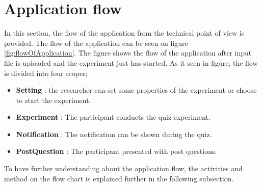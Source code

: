 %

\section{Application flow}
In this section, the flow of the application from the technical point of view is provided.
The flow of the application can be seen
on figure \ref{fig:flowOfApplication}. The figure shows the flow of the application after input file is uploaded and
the experiment just has started.
As it seen in figure, the flow is divided into four scopes;
\begin{itemize}
\item \textbf{Setting}  : the researcher can set some properties of the experiment or choose to start the experiment.
\item \textbf{Experiment} : The participant conducts the quiz experiment.
\item \textbf{Notification} : The notification can be shown during the quiz.
\item \textbf{PostQuestion} : The participant presented with post questions.
\end{itemize}
\par

To have further understanding about the application flow, the activities and method on the flow chart is explained further in the following subsection.



